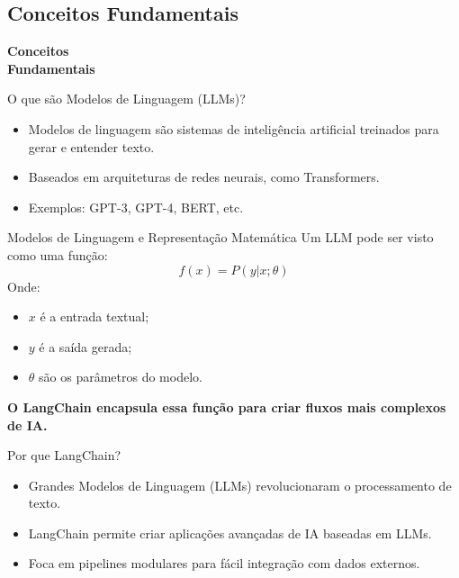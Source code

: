 \documentclass{beamer}
\begin{document}
\subsection{Conceitos Fundamentais}
\begin{frame}
\centering
\Huge
\textbf{Conceitos\\Fundamentais}
\end{frame}
\begin{frame}{O que são Modelos de Linguagem (LLMs)?}
\begin{itemize}
    \item Modelos de linguagem são sistemas de inteligência artificial treinados para gerar e entender texto.
    \item Baseados em arquiteturas de redes neurais, como Transformers.
    \item Exemplos: GPT-3, GPT-4, BERT, etc.
\end{itemize}
   \centering

\end{frame}



\begin{frame}{Modelos de Linguagem e Representação Matemática}
    Um LLM pode ser visto como uma função:
    \begin{equation}
        f(x) = P(y | x; \theta)
    \end{equation}
    Onde:
    \begin{itemize}
        \item $x$ é a entrada textual;
        \item $y$ é a saída gerada;
        \item $\theta$ são os parâmetros do modelo.
    \end{itemize}
    \textbf{O LangChain encapsula essa função para criar fluxos mais complexos de IA.}
\end{frame}

\begin{frame}{Por que LangChain?}
    \begin{itemize}
        \item Grandes Modelos de Linguagem (LLMs) revolucionaram o processamento de texto.
        \item LangChain permite criar aplicações avançadas de IA baseadas em LLMs.
        \item Foca em pipelines modulares para fácil integração com dados externos.
    \end{itemize}
\end{frame}
\end{document}
